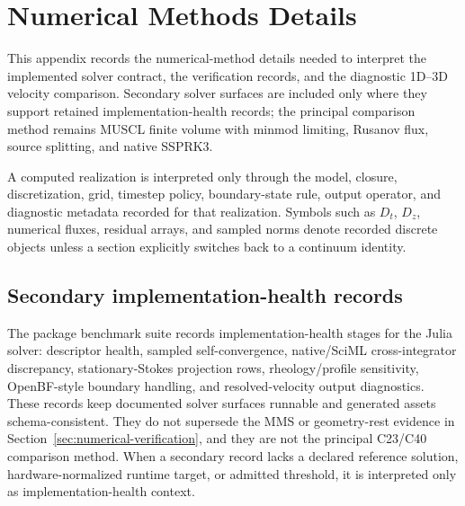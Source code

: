 \section{Numerical Methods Details}
\label{app:numerical-methods-details}
This appendix records the numerical-method details needed to interpret the
implemented solver contract, the verification records, and the diagnostic
1D--3D velocity comparison. Secondary solver surfaces are included only where
they support retained implementation-health records; the principal comparison
method remains MUSCL finite volume with minmod limiting, Rusanov flux, source
splitting, and native SSPRK3.

\begin{convention}
\label{conv:computed-realization-record}
A computed realization is interpreted only through the model, closure,
discretization, grid, timestep policy, boundary-state rule, output operator, and
diagnostic metadata recorded for that realization. Symbols such as $D_t$, $D_z$,
numerical fluxes, residual arrays, and sampled norms denote recorded discrete
objects unless a section explicitly switches back to a continuum identity.
\end{convention}

\subsection{Secondary implementation-health records}
\label{app:num-secondary-implementation-health}
\label{subsec:verification-reproducibility}
\label{subsec:package-benchmark-suite}

The package benchmark suite records implementation-health stages for the Julia
solver: descriptor health, sampled self-convergence, native/SciML
cross-integrator discrepancy, stationary-Stokes projection rows,
rheology/profile sensitivity, OpenBF-style boundary handling, and
resolved-velocity output diagnostics. These records keep documented solver
surfaces runnable and generated assets schema-consistent. They do not supersede
the MMS or geometry-rest evidence in Section~\ref{sec:numerical-verification},
and they are not the principal C23/C40 comparison method. When a secondary
record lacks a declared reference solution, hardware-normalized runtime target,
or admitted threshold, it is interpreted only as implementation-health context.


